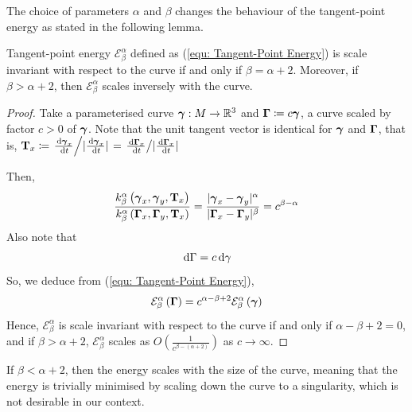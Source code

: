 \documentclass[../dissertation.tex]{subfiles}
\begin{document}
The choice of parameters $\alpha$ and $\beta$ changes the behaviour of the tangent-point energy as stated in the following lemma.
\begin{lemma}
    \label{lemma: Scale-Invariance}
    Tangent-point energy $\mathcal{E}_{\beta}^{\alpha}$ defined as (\ref{equ: Tangent-Point Energy}) is scale invariant with respect to the curve if and only if $\beta = \alpha + 2$.
    Moreover, if $\beta > \alpha + 2$, then $\mathcal{E}_{\beta}^{\alpha}$ scales inversely with the curve.
    \begin{proof}
        Take a parameterised curve $\boldsymbol{\gamma}:M \rightarrow \mathbb{R}^3$ and $\boldsymbol{\Gamma} \coloneqq c \boldsymbol{\gamma}$, a curve scaled by factor $c>0$ of $\boldsymbol{\gamma}$.
        Note that the unit tangent vector is identical for $\boldsymbol{\gamma}$ and $\boldsymbol{\Gamma}$, that is, $\mathbf{T}_x \coloneqq \left. \frac{\, \text{d} \boldsymbol{\gamma}_x}{\, \text{d} t} \middle/ \lvert\frac{\, \text{d} \boldsymbol{\gamma}_x}{\, \text{d} t}\lvert \right. = \left. \frac{\, \text{d} \boldsymbol{\Gamma}_x}{\, \text{d} t} \middle/ \lvert\frac{\, \text{d} \boldsymbol{\Gamma}_x}{\, \text{d} t}\lvert \right. $

        Then,
        \begin{equation}
            \frac{k_{\beta}^{\alpha} \left( \boldsymbol{\gamma}_x, \boldsymbol{\gamma}_y, \mathbf{T}_x \right)}{k_{\beta}^{\alpha} \left( \boldsymbol{\Gamma}_x, \boldsymbol{\Gamma}_y, \mathbf{T}_x \right)}
            =
            \frac{\lvert\boldsymbol{\gamma}_x - \boldsymbol{\gamma}_y\lvert^{\alpha}}{\lvert\boldsymbol{\Gamma}_x - \boldsymbol{\Gamma}_y\lvert^{\beta}} = c^{\beta - \alpha}
        \end{equation}
        Also note that
        \begin{equation}
            \, \text{d} \Gamma = c \, \text{d} \gamma
        \end{equation}
        So, we deduce from (\ref{equ: Tangent-Point Energy}),
        \begin{equation}
            \mathcal{E}_{\beta}^{\alpha} \left( \boldsymbol{\Gamma} \right) = c^{\alpha - \beta + 2} \mathcal{E}_{\beta}^{\alpha} \left( \boldsymbol{\gamma} \right)
        \end{equation}
        Hence, $\mathcal{E}_{\beta}^{\alpha}$ is scale invariant with respect to the curve if and only if $\alpha - \beta + 2 = 0$, and if $\beta > \alpha + 2$, $\mathcal{E}_{\beta}^{\alpha}$ scales as $O\left( \frac{1}{c^{\beta - \left( \alpha + 2 \right)}} \right)$ as $c \rightarrow \infty$.
    \end{proof}
\end{lemma}

\begin{remark}
    If $\beta < \alpha + 2$, then the energy scales with the size of the curve,
    meaning that the energy is trivially minimised by scaling down the curve to a singularity,
    which is not desirable in our context.
\end{remark}
\end{document}
